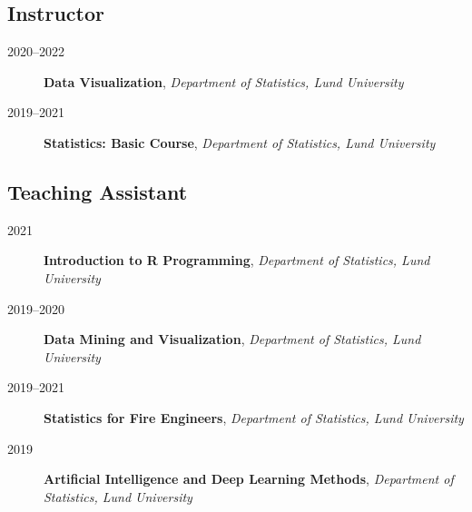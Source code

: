 \documentclass[
  10pt,
  headsepline=true,
  english,
  DIV=12
]{scrartcl}
\renewcommand*{%
  \mkbibnamegiven
}[1]{\ifitemannotation{highlight}{\textbf{#1}}{#1}}
\renewcommand*{%
  \mkbibnamefamily
}[1]{\ifitemannotation{highlight}{\textbf{#1}}{#1}}
\begin{document}
\subsection{Instructor}

\begin{description}
  \item[2020--2022]{
              \textbf{Data Visualization}, \emph{Department of Statistics, Lund
                University}
        }
  \item[2019--2021]{
              \textbf{Statistics: Basic Course}, \emph{Department of Statistics, Lund
                University}

        }
\end{description}

\subsection{Teaching Assistant}

\begin{description}

  \item[2021]{
              \textbf{Introduction to R Programming}, \emph{Department of Statistics,
                Lund University}
        }

  \item[2019--2020]{
              \textbf{Data Mining and Visualization}, \emph{Department of Statistics,
                Lund University}

        }

  \item[2019--2021]{
              \textbf{Statistics for Fire Engineers},
              \emph{Department of Statistics, Lund University}
        }

  \item[2019]{
              \textbf{Artificial Intelligence and Deep Learning Methods},
              \emph{Department of Statistics, Lund University}

        }

\end{description}
\end{document}
